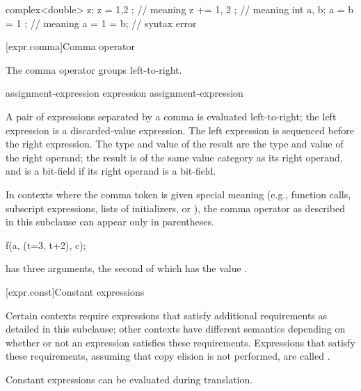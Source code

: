 \begin{example}
\begin{codeblock}
complex<double> z;
z = { 1,2 };        // meaning 
z += { 1, 2 };      // meaning 
int a, b;
a = b = { 1 };      // meaning 
a = { 1 } = b;      // syntax error
\end{codeblock}
\end{example}

[expr.comma]{Comma operator}%
%
%
%
%
%

\pnum
The comma operator groups left-to-right.

\begin{bnf}
\br
    assignment-expression\br
    expression \terminal{,} assignment-expression
\end{bnf}

A pair of expressions separated by a comma is evaluated left-to-right;
the left expression is
a discarded-value expression.
The left expression is sequenced before
the right expression.
%
The type and value of the
result are the type and value of the right operand; the result is of the same
value category as its right operand, and is a bit-field if its
right operand is a bit-field.

\pnum
\begin{note}
In contexts where the comma token is given special meaning
(e.g., function calls,
subscript expressions,
lists of initializers,
or ),
the comma operator as described in this subclause can appear only in parentheses.
\begin{example}
\begin{codeblock}
f(a, (t=3, t+2), c);
\end{codeblock}
has three arguments, the second of which has the value
.
\end{example}
\end{note}

[expr.const]{Constant expressions}%

\pnum
Certain contexts require expressions that satisfy additional
requirements as detailed in this subclause; other contexts have different
semantics depending on whether or not an expression satisfies these requirements.
Expressions that satisfy these requirements,
assuming that copy elision is not performed,
are called
%
.
\begin{note}
Constant expressions can be evaluated
during translation.
\end{note}

